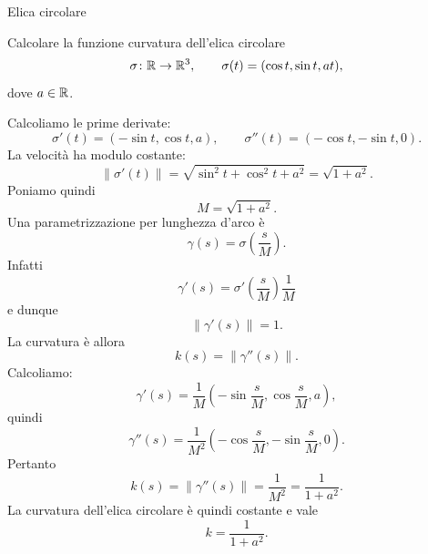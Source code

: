 \documentclass[a4paper]{article}
\begin{document}
\begin{snippetexercise}{Elica circolare}
    \begin{figure}
        \centering
        \begin{minipage}{0.48\linewidth}
            \centering
        \end{minipage}
        \hfill
        \begin{minipage}{0.48\linewidth}
            \centering
        \end{minipage}
    \end{figure}
    Calcolare la funzione curvatura dell'elica circolare
    \[
        \sigma\colon\mathbb{R}\to\mathbb{R}^3,
        \qquad
        \sigma(t)=(\cos t,\sin t,at),
    \]
    dove \(a\in\mathbb{R}\). \wrapfill
\end{snippetexercise}

\begin{snippetsolution}{}
    Calcoliamo le prime derivate:
    \[
        \sigma'(t)=(-\sin t,\cos t,a),
        \qquad
        \sigma''(t)=(-\cos t,-\sin t,0).
    \]
    La velocità ha modulo costante:
    \[
        \left\|\sigma'(t)\right\|
        =
        \sqrt{\sin^2t+\cos^2t+a^2}
        =
        \sqrt{1+a^2}.
    \]
    Poniamo quindi
    \[
        M=\sqrt{1+a^2}.
    \]
    Una parametrizzazione per lunghezza d'arco è
    \[
        \gamma(s)=\sigma\left(\frac{s}{M}\right).
    \]
    Infatti
    \[
        \gamma'(s)=\sigma'\left(\frac{s}{M}\right)\frac1M
    \]
    e dunque
    \[
        \left\|\gamma'(s)\right\|=1.
    \]
    La curvatura è allora
    \[
        k(s)=\left\|\gamma''(s)\right\|.
    \]
    Calcoliamo:
    \[
        \gamma'(s)
        =
        \frac1M
        \left(
            -\sin\frac{s}{M},
            \cos\frac{s}{M},
            a
        \right),
    \]
    quindi
    \[
        \gamma''(s)
        =
        \frac1{M^2}
        \left(
            -\cos\frac{s}{M},
            -\sin\frac{s}{M},
            0
        \right).
    \]
    Pertanto
    \[
        k(s)
        =
        \left\|\gamma''(s)\right\|
        =
        \frac1{M^2}
        =
        \frac1{1+a^2}.
    \]
    La curvatura dell'elica circolare è quindi costante e vale
    \[
        k=\frac1{1+a^2}.
    \]
\end{snippetsolution}
\end{document}
